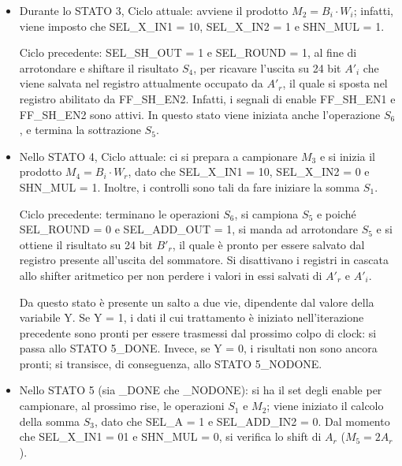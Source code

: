 \begin{itemize}
\noindent Ciclo precedente: pongo  SEL\_SUB\_IN1  =  0 e SEL\_SUB\_IN2  =  10, per indirizzare i dati necessari per effettuare l'operazione di sottrazione $S_5$. In aggiunta, SEL\_ROUND = 0, per arrotondare e traslare verso destra il risultato $S_2$ (al fine di ottenere l'uscita su 24 bit $A'_r$), che verrà poi instradato verso il primo registro in uscita allo Shifter aritmetico effettuato dal blocco moltiplicatore, grazie a SEL\_SH\_OUT =  1. Poiché SEL\_ADD\_OUT =  1, il risultato dell'operazione $S_4$ verrà diretto verso il registro posto successivamente al sommatore. FF\_SH\_EN1 e FF\_SH\_EN2 sono attivi. 

 
\item  Durante lo STATO 3, Ciclo attuale:  avviene il prodotto $M_2 = B_{i} \cdot W_{i}$; infatti, viene imposto che SEL\_X\_IN1 = 10, SEL\_X\_IN2 = 1 e SHN\_MUL = 1. 

\noindent Ciclo precedente: SEL\_SH\_OUT = 1 e SEL\_ROUND = 1, al fine di arrotondare e shiftare il risultato $S_4$, per ricavare l'uscita su 24 bit $A'_i$ che viene salvata nel registro attualmente occupato da $A'_r$, il quale si sposta nel registro abilitato da FF\_SH\_EN2. Infatti, i segnali di enable FF\_SH\_EN1 e FF\_SH\_EN2 sono attivi. In questo stato viene iniziata anche l'operazione $S_6$, e termina la sottrazione $S_5$.

\item Nello STATO 4, Ciclo attuale: ci si prepara a campionare $M_3$ e si inizia il prodotto $M_4 = B_{i} \cdot W_{r}$, dato che SEL\_X\_IN1 = 10, SEL\_X\_IN2 = 0 e SHN\_MUL = 1. 
Inoltre, i controlli sono tali da fare iniziare la somma $S_1$.

\noindent Ciclo precedente:  terminano le operazioni $S_6$, si campiona $S_5$ e  poiché SEL\_ROUND = 0 e SEL\_ADD\_OUT = 1, si manda ad arrotondare $S_5$ e si ottiene il risultato su 24 bit $B'_r$, il quale è pronto per essere salvato dal registro presente all'uscita del sommatore.
Si disattivano i registri in cascata allo shifter aritmetico per non perdere i valori in essi salvati di $A'_r$ e $A'_i$.

\noindent Da questo stato è presente un salto a due vie,  dipendente dal valore della  variabile Y. Se Y = 1, i dati il cui trattamento è iniziato nell'iterazione precedente sono pronti per essere trasmessi dal prossimo colpo di clock: si passa allo STATO 5\_DONE. Invece, se Y = 0, i risultati non sono ancora pronti; si transisce, di conseguenza, allo STATO 5\_NODONE.

\item  Nello STATO 5 (sia \_DONE che \_NODONE): si ha il set degli enable per campionare, al prossimo rise, le operazioni $S_1$ e $M_2$;  viene iniziato il calcolo della somma $S_3$, dato che  SEL\_A = 1 e SEL\_ADD\_IN2 = 0. Dal momento che SEL\_X\_IN1 =  01 e SHN\_MUL = 0, si verifica lo shift di $A_{r}$ ($M_5 = 2A_{r}$).


\end{itemize}
